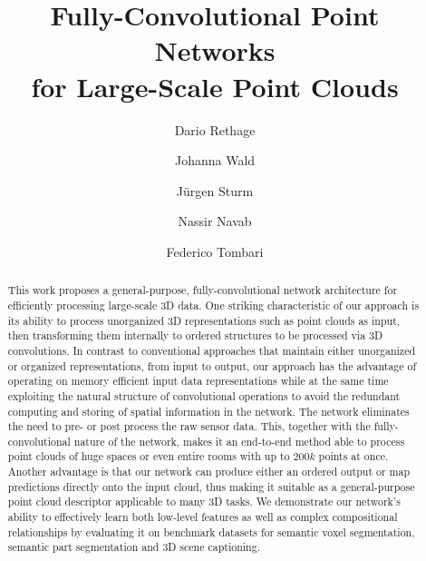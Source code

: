 \documentclass[runningheads]{llncs}
\begin{document}
\title{Fully-Convolutional Point Networks\\for Large-Scale Point Clouds} 

\author{Dario Rethage \and
Johanna Wald \and
J\"urgen Sturm \and \break
Nassir Navab \and
Federico Tombari}

\maketitle              %
\begin{abstract}
This work proposes a general-purpose, fully-convolutional network architecture for efficiently processing large-scale 3D data. One striking characteristic of our approach is its ability to process unorganized 3D representations such as point clouds as input, then transforming them internally to ordered structures to be processed via 3D convolutions. In contrast to conventional approaches that maintain either unorganized or organized representations, from input to output, our approach has the advantage of operating on memory efficient input data representations while at the same time exploiting the natural structure of convolutional operations to avoid the redundant computing and storing of spatial information in the network. The network eliminates the need to pre- or post process the raw sensor data. This, together with the fully-convolutional nature of the network, makes it an end-to-end method able to process point clouds of huge spaces or even entire rooms with up to $200k$ points at once. Another advantage is that our network can produce either an ordered output or map predictions directly onto the input cloud, thus making it suitable as a general-purpose point cloud descriptor applicable to many 3D tasks. We demonstrate our network's ability to effectively learn both low-level features as well as complex compositional relationships by evaluating it on benchmark datasets for semantic voxel segmentation, semantic part segmentation and 3D scene captioning.

\end{abstract}
\end{document}
